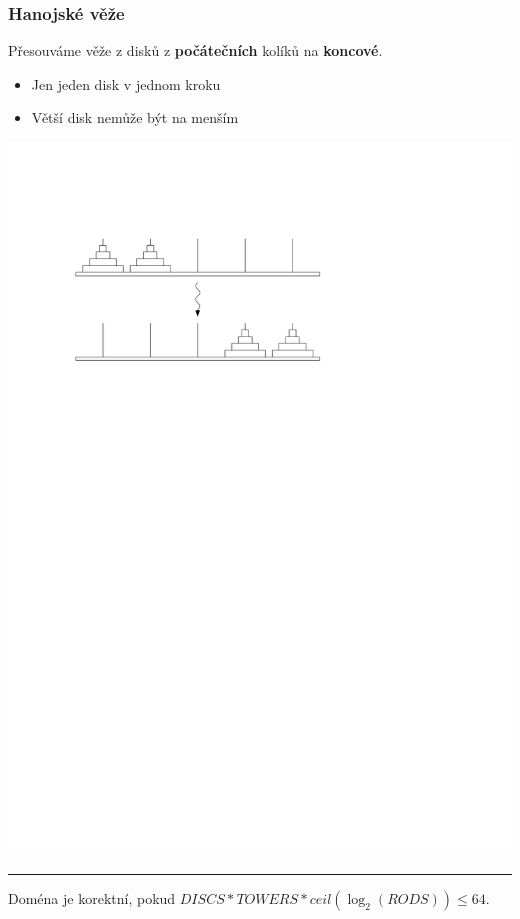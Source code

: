 \documentclass[usenames,dvipsnames,9pt]{beamer}
\begin{document}
\begin{frame}
  \frametitle{Hanojské věže}
  
  Přesouváme věže z disků z {\bf počátečních} kolíků na {\bf koncové}.
  
  \begin{itemize}
  \item Jen jeden disk v jednom kroku
  \item Větší disk nemůže být na menším
  \end{itemize}
  
  \vspace{1em}

\begin{center}
\includegraphics[width=0.5\linewidth]{figs/hanoi.pdf}
\end{center}

\vspace{1em}\hrule\vspace{1em}

\faWarning\hspace{3pt} Doména je korektní, pokud $DISCS*TOWERS*ceil(\log_2(RODS)) \leq 64$.

\end{frame}
\end{document}
